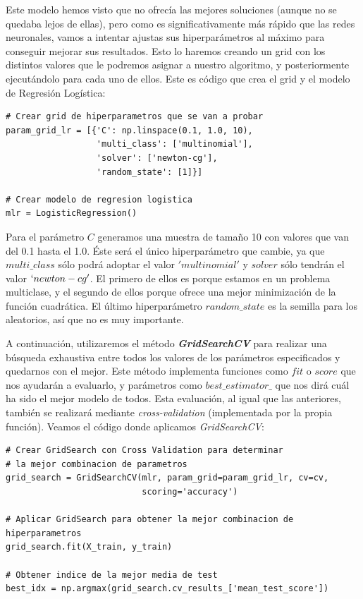 \documentclass[11pt,a4paper]{article}
\begin{document}
Este modelo hemos visto que no ofrecía las mejores soluciones (aunque no se quedaba lejos de ellas), pero como es significativamente más
rápido que las redes neuronales, vamos a intentar ajustas sus hiperparámetros al máximo para conseguir mejorar sus resultados. Esto lo
haremos creando un grid con los distintos valores que le podremos asignar a nuestro algoritmo, y posteriormente ejecutándolo para cada uno
de ellos. Este es código que crea el grid y el modelo de Regresión Logística:

\begin{lstlisting}
# Crear grid de hiperparametros que se van a probar
param_grid_lr = [{'C': np.linspace(0.1, 1.0, 10),
                  'multi_class': ['multinomial'],
                  'solver': ['newton-cg'],
                  'random_state': [1]}]

# Crear modelo de regresion logistica
mlr = LogisticRegression()
\end{lstlisting}

Para el parámetro $C$ generamos una muestra de tamaño 10 con valores que van del 0.1 hasta el 1.0. Éste será el único hiperparámetro que
cambie, ya que $multi\_class$ sólo podrá adoptar el valor $'multinomial'$ y $solver$ sólo tendrán el valor $`newton-cg'$. El primero de
ellos es porque estamos en un problema multiclase, y el segundo de ellos porque ofrece una mejor minimización de la función cuadrática. El
último hiperparámetro $random\_state$ es la semilla para los aleatorios, así que no es muy importante.

A continuación, utilizaremos el método \textbf{\textit{GridSearchCV}}\cite{GridSearchCV} para realizar una búsqueda exhaustiva entre todos
los valores de los parámetros especificados y quedarnos con el mejor. Este método implementa funciones como $fit$ o $score$ que nos
ayudarán a evaluarlo, y parámetros como $best\_estimator\_$ que nos dirá cuál ha sido el mejor modelo de todos. Esta evaluación, al igual
que las anteriores, también se realizará mediante \textit{cross-validation} (implementada por la propia función). Veamos el código donde
aplicamos \textit{GridSearchCV}:

\begin{lstlisting}
# Crear GridSearch con Cross Validation para determinar
# la mejor combinacion de parametros
grid_search = GridSearchCV(mlr, param_grid=param_grid_lr, cv=cv,
                           scoring='accuracy')

# Aplicar GridSearch para obtener la mejor combinacion de hiperparametros
grid_search.fit(X_train, y_train)

# Obtener indice de la mejor media de test
best_idx = np.argmax(grid_search.cv_results_['mean_test_score'])

\end{lstlisting}
\end{document}
